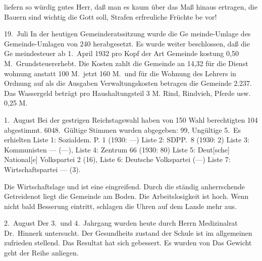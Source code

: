 

liefern so würdig gutes Herr, daß man es kaum über\ohb
das Maß hinaus ertragen, die Bauern sind wichtig\unsicher\ob
die\unsicher{} Gott soll, Strafen erfreuliche Früchte be\ohb
vor!

19.\ Juli    In der heutigen Gemeinderatssitzung wurde die Ge\ohb
meinde-Umlage des Gemeinde-Umlagen von 240%
herabgesetzt. Es wurde weiter beschlossen, daß die Ge\ohb
meindesteuer ab 1.\ April 1932 pro Kopf der Art\unsicher{} Gemeinde\ohb
kostung 0,50 M.\ Grundsteuer\unsicher erhebt.\ob
Die Kosten zahlt die Gemeinde an 14,32 für die Dienst\ohb
wohnung anstatt 100 M.\ jetzt 160 M.\ und für die Wohnung\ob
des Lehrers\unsicher{} in Ordnung     \unsicher{} auf\unsicher{} als\unsicher\ob
die Ausgaben\unsicher{} Verwaltungskosten betragen die\ob
Gemeinde 2.237\unsicher.\ob
Das Wassergeld beträgt pro Haushaltungsteil 3 M.\unsicher\ob
Rind, Rindvieh, Pferde usw. 0,25 M.

1.\ August  Bei der gestrigen Reichstagswahl haben von 150 Wahl\ohb
berechtigten 104 abgestimmt. 6048.\ Gültige Stimmen\ob
wurden abgegeben: 99, Ungültige 5.\ Es erhielten\ob
Liste 1: Sozialdem. P. 1 (1930: —) Liste 2: SDP\unsicher P.\ 8 (1930: 2) Liste 3:\ob
Kommunisten — (—), Liste 4: Zentrum 66 (1930: 80) Liste 5: Deut{[sche]}\ob
National{[e]} Volkspartei 2 (16), Liste 6: Deutsche Volkspartei (—)\ob
Liste 7: Wirtschaftspartei — (3).

Die Wirtschaftslage\unsicher{} und\unsicher{} ist eine eingreifend\unsicher. Durch die\ob
ständig anherrschende Getreidenot liegt die Gemeinde am\ob
Boden. Die Arbeitslosigkeit ist hoch\unsicher. Wenn nicht\ob
bald\unsicher{} Besserung eintritt, schlagen die Uhren auf\ob
dem Lande mehr\unsicher{} aus.

2.\ August  Der 3.\ und 4.\ Jahrgang wurden heute durch Herrn\ob
Medizinalrat Dr.\ Hinnerk untersucht. Der Gesundheits\ohb
zustand der Schule ist im allgemeinen zufrieden\ohb
stellend. Das Resultat hat sich gebessert. Es wurden\ob
\unsicher von\unsicher{} Das Gewicht geht der Reihe anliegen.
\pend
